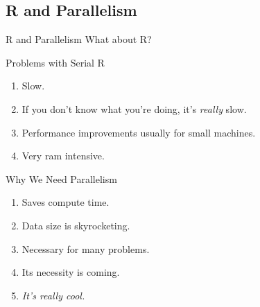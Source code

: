 \subsection{R and Parallelism}


\begin{frame}
  \begin{block}{R and Parallelism}\pause
  What about R?
  \end{block}
\end{frame}

\begin{frame}
  \begin{block}{Problems with Serial R}\pause
  \begin{enumerate}[<+-|alert@+>]
    \item Slow.
    \item If you don't know what you're doing, it's \emph{really} slow.
    \item Performance improvements usually for small machines.
    \item Very ram intensive.
  \end{enumerate}
  \end{block}
\end{frame}


\begin{frame}
  \begin{block}{Why We Need Parallelism}\pause
    \begin{enumerate}[<+-|alert@+>]
      \item Saves compute time.
      \item Data size is skyrocketing.
      \item Necessary for many problems.
      \item Its necessity is coming.
      \item \emph{It's really cool.}
  \end{enumerate}
  \end{block}
\end{frame}

